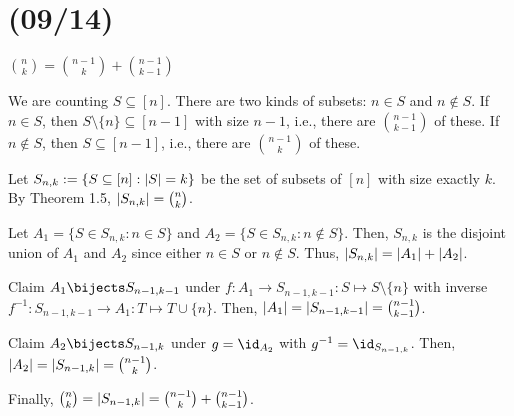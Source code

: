 \documentclass[class=math239,notes]{agony}
\begin{document}
\section{(09/14)}

\begin{example}
  $\binom{n}{k} = \binom{n-1}{k} + \binom{n-1}{k-1}$
\end{example}
\begin{prf}[informal]
  We are counting $S \subseteq [n]$.
  There are two kinds of subsets: $n \in S$ and $n \not\in S$.
  If $n \in S$, then $S \setminus\{n\} \subseteq [n-1]$ with size $n-1$,
  i.e., there are $\binom{n-1}{k-1}$ of these.
  If $n \not\in S$, then $S \subseteq [n-1]$, i.e., there are $\binom{n-1}{k}$ of these.
\end{prf}
\begin{prf}
  Let $S_{n,k} := \{ S \subseteq [n] : \abs{S} = k\}$ be the set of subsets of $[n]$ with size exactly $k$.
  By Theorem 1.5, $\abs{S_{n,k}} = \binom{n}{k}$.

  Let $A_1 = \{S \in S_{n,k} : n \in S\}$ and $A_2 = \{S \in S_{n,k} : n \not\in S\}$.
  Then, $S_{n,k}$ is the disjoint union of $A_1$ and $A_2$ since either $n \in S$ or $n \not\in S$.
  Thus, $\abs{S_{n,k}} = \abs{A_1} + \abs{A_2}$.

  Claim $A_1 \bijects S_{n-1,k-1}$  under $f : A_1 \to S_{n-1,k-1} : S \mapsto S \setminus \{n\}$
  with inverse $f^{-1} : S_{n-1,k-1} \to A_1 : T \mapsto T \cup \{n\}$.
  Then, $\abs{A_1} = \abs{S_{n-1,k-1}} = \binom{n-1}{k-1}$.

  Claim $A_2 \bijects S_{n-1,k}$ under $g = \id_{A_2}$ with $g^{-1} = \id_{S_{n-1,k}}$.
  Then, $\abs{A_2} = \abs{S_{n-1,k}} = \binom{n-1}{k}$.

  Finally, $\binom{n}{k} = \abs{S_{n-1,k}} = \binom{n-1}{k} + \binom{n-1}{k-1}$.
\end{prf}
\end{document}
